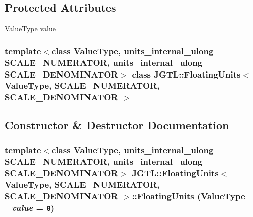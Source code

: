 \subsection*{Protected Attributes}
\begin{CompactItemize}
\item 
Value\-Type \hyperlink{class_j_g_t_l_1_1_floating_units_5e84b8db278f0079f543818213b2bac5}{value}
\end{CompactItemize}
\subsubsection*{template$<$class Value\-Type, units\_\-internal\_\-ulong SCALE\_\-NUMERATOR, units\_\-internal\_\-ulong SCALE\_\-DENOMINATOR$>$ class JGTL::Floating\-Units$<$ Value\-Type, SCALE\_\-NUMERATOR, SCALE\_\-DENOMINATOR $>$}



\subsection{Constructor \& Destructor Documentation}
\hypertarget{class_j_g_t_l_1_1_floating_units_4f7658a1fa622c855a6c5923eb5add64}{
\subsubsection[FloatingUnits]{\setlength{\rightskip}{0pt plus 5cm}template$<$class Value\-Type, units\_\-internal\_\-ulong SCALE\_\-NUMERATOR, units\_\-internal\_\-ulong SCALE\_\-DENOMINATOR$>$ \hyperlink{class_j_g_t_l_1_1_floating_units}{JGTL::Floating\-Units}$<$ Value\-Type, SCALE\_\-NUMERATOR, SCALE\_\-DENOMINATOR $>$::\hyperlink{class_j_g_t_l_1_1_floating_units}{Floating\-Units} (Value\-Type {\em \_\-value} = {\tt 0})}}
\label{class_j_g_t_l_1_1_floating_units_4f7658a1fa622c855a6c5923eb5add64}


